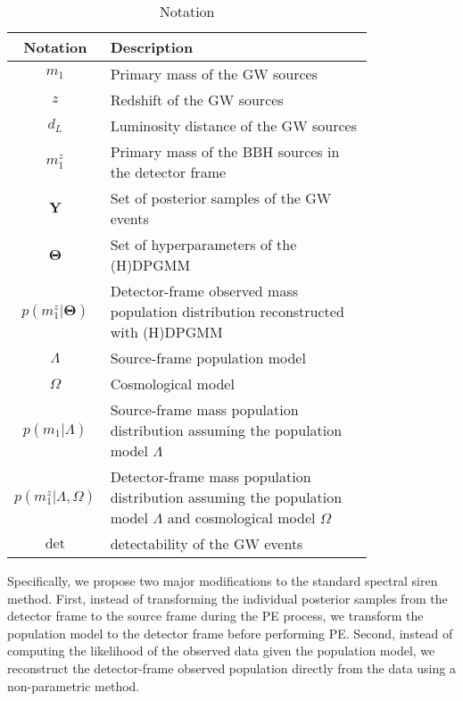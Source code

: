 \documentclass[aps,prd,twocolumn,superscriptaddress,preprintnumbers,nofootinbib,hidelinks]{revtex4-2}
\begin{document}
\begin{table}
    \label{tab:notation}
    \caption{Notation}
    \begin{ruledtabular}
        \begin{tabular}{c>{\raggedright\arraybackslash}p{0.8\linewidth}}
            Notation & Description \\
            \hline
            $m_1$ & Primary mass of the \ac{GW} sources \\
            $z$ & Redshift of the \ac{GW} sources \\
            $d_L$ & Luminosity distance of the \ac{GW} sources \\
            $m^z_1$ & Primary mass of the \ac{BBH} sources in the detector frame \\
            $\mathbf{Y}$ & Set of posterior samples of the \ac{GW} events \\
            $\mathbf{\Theta}$ & Set of hyperparameters of the \ac{(H)DPGMM} \\
            $p(m^z_1|\mathbf{\Theta})$ & Detector-frame observed mass population distribution reconstructed with \ac{(H)DPGMM} \\
            $\Lambda$ & Source-frame population model \\
            $\Omega$ & Cosmological model \\
            $p(m_1|\Lambda)$ & Source-frame mass population distribution assuming the population model $\Lambda$ \\
            $p(m^z_1|\Lambda, \Omega)$ & Detector-frame mass population distribution assuming the population model $\Lambda$ and cosmological model $\Omega$ \\
            $\mathrm{det}$ & detectability of the \ac{GW} events \\
        \end{tabular}
        \end{ruledtabular}
\end{table}

Specifically, we propose two major modifications to the standard spectral siren method.
First, instead of transforming the individual posterior samples from the detector frame to the source frame during the \ac{PE} process, we transform the population model to the detector frame before performing \ac{PE}.
Second, instead of computing the likelihood of the observed data given the population model, we reconstruct the detector-frame observed population directly from the data using a non-parametric method.
\end{document}
